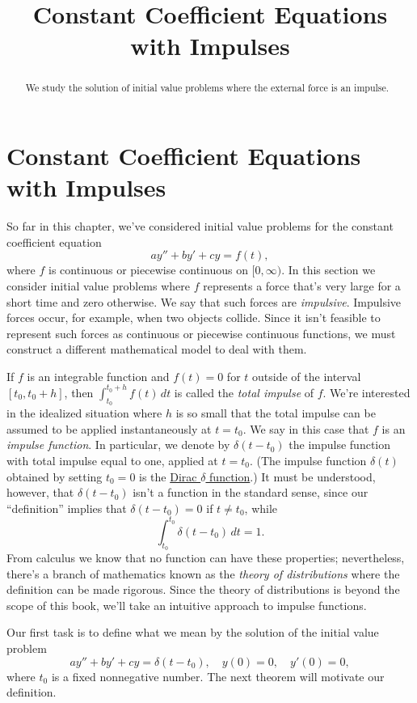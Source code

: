 \documentclass{ximera}
\title{Constant Coefficient Equations with Impulses}%
\begin{document}
\begin{abstract}
We study the solution of initial value problems where the external force is an impulse.
\end{abstract}

\maketitle

\section*{Constant Coefficient Equations with Impulses}

So far in this chapter, we've considered initial value problems
for the constant coefficient equation
$$
ay''+by'+cy=f(t),
$$
where $f$ is continuous or piecewise continuous on $[0,\infty)$. In
this section we consider initial value problems where $f$
represents a force that's very large for a short time and
zero otherwise. We say that such forces are \textit{impulsive}.
Impulsive forces occur, for example, when two objects collide. Since
it isn't  feasible to represent such forces as continuous or
piecewise continuous functions, we must construct a different
mathematical model to deal with them.

If $f$ is an integrable function and $f(t)=0$ for $t$ outside of
the interval $[t_0,t_0+h]$, then $\int_{t_0}^{t_0+h} f(t)\,dt$ is
called the \textit{total impulse} of $f$. We're interested in the
idealized situation where $h$ is so small that the total impulse
can be assumed to be applied instantaneously at $t=t_0$. We say in
this case that $f$ is an \textit{impulse function}. In particular, we
denote by $\delta(t-t_0)$ the impulse function with total impulse
equal to one, applied at $t=t_0$. (The impulse function $\delta(t)$
obtained by setting $t_0=0$ is  the
\href{https://en.wikipedia.org/wiki/Dirac_delta_function}
{Dirac $\delta$ function\/}.) It must be understood, however, that
$\delta(t-t_0)$ isn't  a function in the standard sense, since our
``definition'' implies that $\delta(t-t_0)=0$ if $t\neq t_0$, while
$$
\int_{t_0}^{t_0} \delta(t-t_0)\,dt=1.
$$
From calculus we know that no function can have these properties;
nevertheless, there's a branch of mathematics known as the
\textit{theory of distributions} where  the  definition can be made
rigorous. Since the theory of distributions is beyond the
scope of this book, we'll take an intuitive approach to impulse
functions.

Our first task is to define what we mean by the solution of
the initial value problem
$$
ay''+by'+cy=\delta(t-t_0), \quad  y(0)=0,\quad y'(0)=0,
$$
where $t_0$ is a fixed nonnegative number. The next theorem will
motivate our definition.
\end{document}
